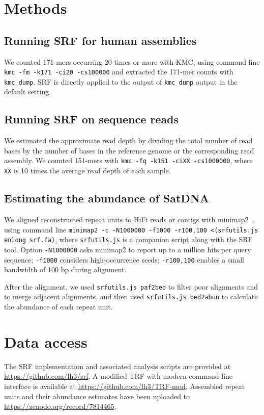 \documentclass{bioinfo}
\begin{document}
\section{Methods}

\subsection{Running SRF for human assemblies}

We counted 171-mers occurring 20 times or more with KMC, using command line
{\tt kmc -fm -k171 -ci20 -cs100000} and extracted the 171-mer counts with
{\tt kmc\_dump}. SRF is directly applied to the output of {\tt kmc\_dump}
output in the default setting.

\subsection{Running SRF on sequence reads}

We estimated the approximate read depth by dividing the total number of read
bases by the number of bases in the reference genome or the corresponding
read assembly. We counted 151-mers with {\tt kmc -fq -k151 -ciXX -cs1000000},
where {\tt XX} is 10 times the average read depth of each sample.

\subsection{Estimating the abundance of SatDNA}

We aligned reconstructed repeat units to HiFi reads or contigs with
minimap2~\citep{Li:2018ab}, using command line {\tt minimap2 -c -N1000000
-f1000 -r100,100 <(srfutils.js enlong srf.fa)}, where {\tt srfutils.js} is a
companion script along with the SRF tool. Option {\tt -N1000000} asks minimap2
to report up to a million hits per query sequence; {\tt -f1000} considers
high-occurrence seeds; {\tt -r100,100} enables a small bandwidth of 100 bp
during alignment.

After the alignment, we used {\tt srfutils.js paf2bed} to filter poor
alignments and to merge adjacent alignments, and then used {\tt srfutils.js
bed2abun} to calculate the abundance of each repeat unit.

\section{Data access}

The SRF implementation and associated analysis scripts are provided at
\href{https://github.com/lh3/srf}{https://github.com/lh3/srf}. A modified TRF
with modern command-line interface is available at
\href{https://github.com/lh3/TRF-mod}{https://github.com/lh3/TRF-mod}.
Assembled repeat units and their abundance estimates have been uploaded to
\href{https://zenodo.org/record/7814465}{https://zenodo.org/record/7814465}.
\end{document}
